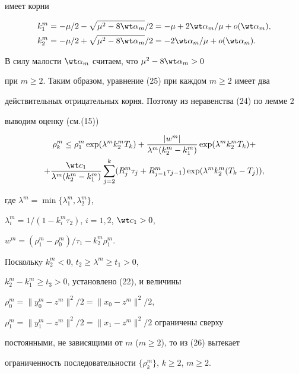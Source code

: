 имеет корни


\begin{align*}


k_1^m&=-\mu /2-\sqrt{\mu^2-8\wt \alpha_m}/2=-\mu+


2\wt \alpha_m/\mu+o(\wt \alpha_m),\\


%


k_2^m&=-\mu /2+\sqrt{\mu^2-8\wt \alpha_m}/2=-2\wt \alpha_m/\mu+


o(\wt \alpha_m).


\end{align*}


В силу малости $\wt \alpha_m$ считаем, что $\mu^2-8\wt\alpha_m >0$


при $m\geq 2$. Таким образом, уравнение (25) при каждом $m\geq 2$ имеет два


действительных отрицательных корня. Поэтому из неравенства (24) по лемме 2


выводим оценку (см.(15))


\begin{multline}\label {26}


\rho_k^m\leq \rho_1^m \exp(\lambda^mk_2^mT_k)+\frac{|w^m|}


{\lambda^m(k_2^m-k_1^m)}\exp(\lambda^mk_2^mT_k)+ \\


%


+\frac{\wt c_1}{\lambda^m(k_2^m-k_1^m)}\sum_{j=2}^k(R_j^m\tau_j+


R_{j-1}^m\tau_{j-1})\exp(\lambda^mk_2^m(T_k-T_j)),


\end{multline}


где $\lambda^m=\min\{\lambda_1^m,\lambda_2^m\}$,


$\lambda_i^m=1/(1-k_i^m\tau_2)$, $i=1,2$, $\wt c_1>0$,


$w^m=(\rho_1^m-\rho_0^m)/\tau_1-k_2^m\rho_1^m$.


Посколькy $k_2^m <0$, $t_2\geq \lambda^m \geq t_1>0$,


$k_2^m-k_1^m\geq t_3>0$, установлено (22), и величины


$\rho_0^m=\|y_0^m-z^m\|^2/2=\|x_0-z^m\|^2/2$,


$\rho_1^m=\|y_1^m-z^m\|^2/2=\|x_1-z^m\|^2/2$ ограничены сверху


постоянными, не зависящими от $m$ ($m\geq 2$), то из (26) вытекает


ограниченность последовательности $\{\rho_k^m\}$, $k\geq 2$, $m\geq 2$.


